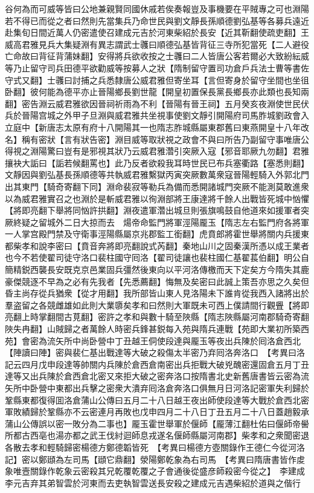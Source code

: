 谷何為而可威等皆曰公地兼親賢同國休戚若俟奏報豈及事機要在平賊專之可也淵陽若不得已而從之者曰然則先當集兵乃命世民與劉文靜長孫順德劉弘基等各募兵遠近赴集旬日間近萬人仍密遣使召建成元吉於河東柴紹於長安【近其靳翻使疏吏翻】王威高君雅見兵大集疑淵有異志謂武士彠曰順德弘基皆背征三寺所犯當死【二人避役亡命故曰背征背蒲妹翻】安得將兵欲收按之士彠曰二人皆唐公客若爾必大致紛紜威等乃止留守司兵田德平欲勸威等按募人之狀【隋制留守置司功倉戶兵法士曹等書佐守式又翻】士彠曰討捕之兵悉隸唐公威君雅但寄坐耳【言但寄身於留守坐間也坐徂卧翻】彼何能為德平亦止晉陽鄉長劉世龍【開皇初置保長黨長鄉長亦此類也長知兩翻】密告淵云威君雅欲因晉祠祈雨為不利【晉陽有晉王祠】五月癸亥夜淵使世民伏兵於晉陽宫城之外甲子旦淵與威君雅共坐視事使劉文靜引開陽府司馬胙城劉政會入立庭中【新唐志太原有府十八開陽其一也隋志胙城縣屬東郡舊曰東燕開皇十八年改名】稱有密狀【言有狀告密】淵目威等取狀視之政會不與曰所告乃副留守事唯唐公得視之淵陽驚曰豈有是邪視其狀乃云威君雅濳引突厥入寇【邪音耶厥九勿翻】君雅攘袂大詬曰【詬若候翻罵也】此乃反者欲殺我耳時世民已布兵塞衢路【塞悉則翻】文靜因與劉弘基長孫順德等共執威君雅繫獄丙寅突厥數萬衆寇晉陽輕騎入外郭北門出其東門【騎奇寄翻下同】淵命裴寂等勒兵為備而悉開諸城門突厥不能測莫敢進衆以為威君雅實召之也淵於是斬威君雅以徇淵部將王康達將千餘人出戰皆死城中忷懼【將即亮翻下舉將同忷許拱翻】淵夜遣軍濳出城旦則張旗鳴鼓自他道來如援軍者突厥終疑之留城外二日大掠而去　煬帝命監門將軍涇陽龎玉【隋志左右監門府各將軍一人掌宫殿門禁及守衛事涇陽縣屬京兆郡監工銜翻】虎賁郎將霍世舉將關内兵援東都柴孝和說李密曰【賁音奔將即亮翻說式芮翻】秦地山川之固秦漢所憑以成王業者也今不若使翟司徒守洛口裴柱國守囘洛【翟司徒讓也裴柱國仁基翟萇伯翻】明公自簡精鋭西襲長安既克京邑業固兵彊然後東向以平河洛傳檄而天下定矣方今隋失其鹿豪傑競逐不早為之必有先我者【先悉薦翻】悔無及矣密曰此誠上策吾亦思之久矣但昏主尚存從兵猶衆【從才用翻】我所部皆山東人見洛陽未下誰肯從我西入諸將出於羣盗留之各競雌雄如此則大業隳矣孝和曰然則大軍既未可西上僕請間行觀舋【將即亮翻上時掌翻間古莧翻】密許之孝和與數十騎至陜縣【隋志陜縣屬河南郡騎奇寄翻陜失冉翻】山賊歸之者萬餘人時密兵鋒甚鋭每入苑與隋兵連戰【苑即大業初所築西苑】會密為流矢所中尚卧營中丁丑越王侗使段達與龎玉等夜出兵陳於囘洛倉西北【陣讀曰陣】密與裴仁基出戰達等大破之殺傷太半密乃弃囘洛奔洛口　【考異曰洛記云四月戊申段達等帥關内兵陳於倉西倉南密出兵拒戰大破兇醜密還固倉五月丁丑達等又出兵陳於倉西倉北密又來拒大破之密奔洛口按隋書北史新舊唐書皆云密為流矢所中卧營中東都出兵擊之密衆大潰弃囘洛倉奔洛口俱無月日河洛記密軍失利歸於鞏縣東都復得囬洛倉蒲山公傳曰五月二十八日越王夜出師使段達等大戰於倉西北密軍敗績歸於鞏縣亦不云密連月再敗也戊申四月二十八日丁丑五月二十八日蓋趙毅承蒲山公傳誤以密一敗分為二事也】龎玉霍世舉軍於偃師【龎薄江翻杜佑曰偃師帝嚳所都古西亳也湯亦都之武王伐紂迴師息戎遂名偃師縣屬河南郡】柴孝和之衆聞密退各散去孝和輕騎歸密楊德方鄭德韜皆死　【考異曰楊德方壺關錄作王德仁今從河洛記】密以鄭頲為左司馬【頲它鼎翻】滎陽鄭乾象為右司馬　【考異曰隋唐書皆作䖍象唯壼關錄作乾象云密殺其兄乾覆乾覆之子會通後從盛彦師殺密今從之】　李建成李元吉弃其弟智雲於河東而去吏執智雲送長安殺之建成元吉遇柴紹於道與之偕行

